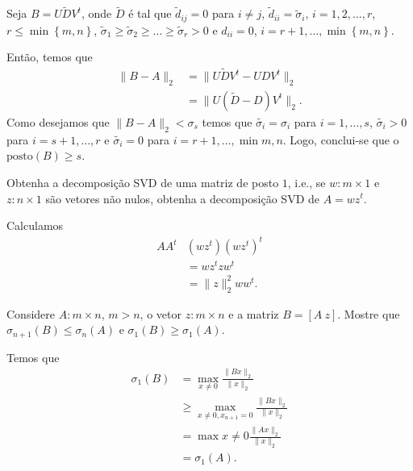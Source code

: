 \begin{questions}
\begin{solution}
        Seja $B = U \tilde{D} V^t$, onde $\tilde{D}$ \'{e} tal que $\tilde{d}_{ij} = 0$ para $i \neq j$, $\tilde{d}_{ii} = \tilde{\sigma}_i$, $i = 1, 2, \ldots, r$, $r \leq \min\left\{ m, n \right\}$, $\tilde{\sigma}_1 \geq \tilde{\sigma}_2 \geq \ldots \geq \tilde{\sigma}_r > 0$ e $d_{ii} = 0$, $i = r + 1, \ldots, \min\left\{ m, n \right\}$. 

        Ent\~{a}o, temos que
        \begin{align*}
            \| B - A \|_2 &= \| U \tilde{D} V^t - U D V^t \|_2 \\
            &= \| U \left( \tilde{D} - D \right) V^t \|_2.
        \end{align*}
        Como desejamos que $\| B - A \|_2 < \sigma_s$ temos que $\tilde{\sigma_i} = \sigma_i$ para $i = 1, \ldots, s$, $\tilde{\sigma_i} > 0$ para $i = s + 1, \ldots, r$ e $\tilde{\sigma_i} = 0$ para $i = r + 1, \ldots, \min{m, n}$. Logo, conclui-se que o $\mathrm{posto}(B) \geq s$.
    \end{solution}

    \question Obtenha a decomposi\c{c}\~{a}o SVD de uma matriz de posto $1$, i.e., se $w : m \times 1$ e $z : n \times 1$ s\~{a}o vetores n\~{a}o nulos, obtenha a decomposi\c{c}\~{a}o SVD de $A = w z^t$.
    \begin{solution}
        Calculamos
        \begin{align*}
            A A^t & \left( w z^t \right) \left( w z^t \right)^t \\
            &= w z^t z w^t \\
            &= \| z \|_2^2 w w^t.
        \end{align*}
    \end{solution}

    \question Considere $A : m \times n$, $m > n$, o vetor $z : m \times n$ e a matriz $B = [A \ z]$. Mostre que $\sigma_{n + 1}(B) \leq \sigma_n(A)$ e $\sigma_1(B) \geq \sigma_1(A)$.
    \begin{solution}
        Temos que
        \begin{align*}
            \sigma_1(B) &= \max_{x \neq 0} \frac{\| B x \|_2}{\| x \|_2} \\
            &\geq \max_{x \neq 0, x_{n + 1} = 0} \frac{\| B x \|_2}{\| x \|_2} \\
            &= \max{x \neq 0} \frac{\| A x \|_2}{\| x \|_2} \\
            &= \sigma_1(A).
        \end{align*}
    \end{solution}


\end{questions}

